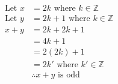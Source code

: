 \documentclass{article}
\begin{document}
\begin{align*}
    \text{Let } x & = 2k \text{ where } k \in \mathbb{Z}     \\
    \text{Let } y & = 2k + 1 \text{ where } k \in \mathbb{Z} \\
    x + y         & = 2k + 2k + 1                            \\
                  & = 4k + 1                                 \\
                  & = 2(2k) + 1                              \\
                  & = 2k' \text{ where } k' \in \mathbb{Z}   \\
                  & \therefore x + y \text{ is odd}
\end{align*}
\end{document}
